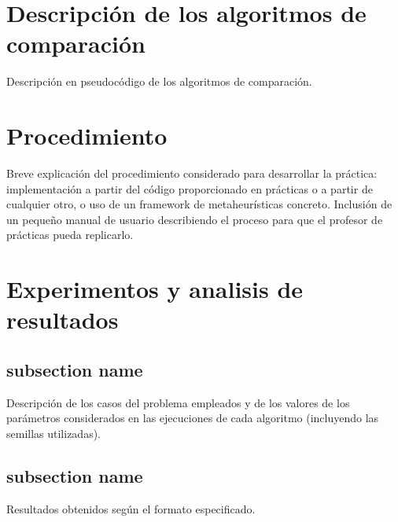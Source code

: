 \section{Descripción de los algoritmos de comparación}
Descripción en pseudocódigo de los algoritmos de comparación.

\section{Procedimiento}
Breve explicación del procedimiento considerado para desarrollar la práctica:
implementación a partir del código proporcionado en prácticas o a partir de
cualquier otro, o uso de un framework de metaheurísticas concreto. Inclusión de
un pequeño manual de usuario describiendo el proceso para que el profesor
de prácticas pueda replicarlo.

\section{Experimentos y analisis de resultados}
\subsection{subsection name}
Descripción de los casos del problema empleados y de los valores de los
parámetros considerados en las ejecuciones de cada algoritmo
(incluyendo las semillas utilizadas).
\subsection{subsection name}
Resultados obtenidos según el formato especificado.

